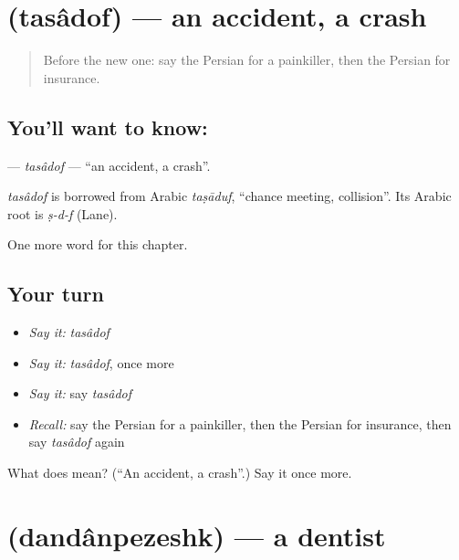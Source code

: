 \section[\texorpdfstring{\fa{تصادف} (tasâdof)}{تصادف (tasâdof)}]{ (tasâdof) — an accident, a crash}

\label{lesson:FA-C227-tasadof}



\begin{quote}
Before the new one: say the Persian for a painkiller, then the Persian for insurance.
\end{quote}

\subsection*{You'll want to know: }
\textbf{} — \emph{tasâdof} — \textquotedblleft{}an accident, a crash\textquotedblright{}.

\begin{cousinweb}
\emph{tasâdof} is borrowed from Arabic \emph{taṣāduf}, \textquotedblleft{}chance meeting, collision\textquotedblright{}. Its Arabic root is \emph{ṣ-d-f} (Lane).
\end{cousinweb}

\begin{grammarlens}[title={What you've built}]
One more word for this chapter.
\end{grammarlens}

\subsection*{Your turn}
\begin{itemize}
\raggedright
  \item \emph{Say it:} \emph{tasâdof}
  \item \emph{Say it:} \emph{tasâdof}, once more
  \item \emph{Say it:} say \emph{tasâdof}
  \item \emph{Recall:} say the Persian for a painkiller, then the Persian for insurance, then say \emph{tasâdof} again
\end{itemize}

\begin{tcolorbox}[breakable,colback=teal!4,colframe=teal!35!black,title={Before you move on}]
What does  mean? (\textquotedblleft{}An accident, a crash\textquotedblright{}.) Say it once more.
\end{tcolorbox}
\section[\texorpdfstring{\fa{دندانپزشک} (dandânpezeshk)}{دندانپزشک (dandânpezeshk)}]{ (dandânpezeshk) — a dentist}

